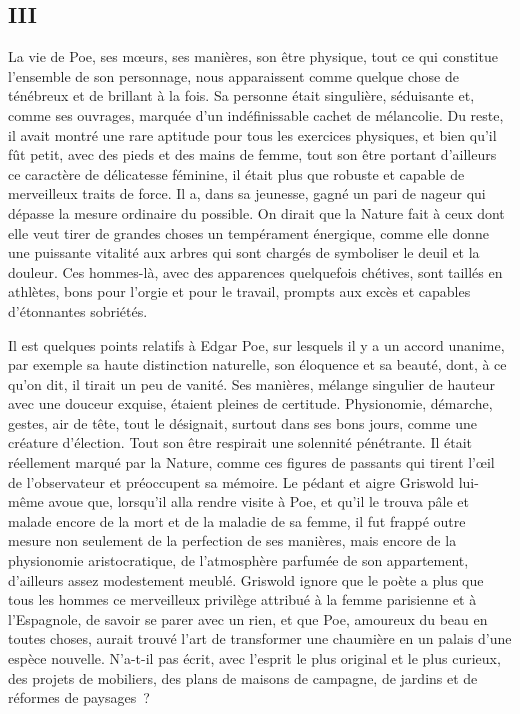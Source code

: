 \documentclass[french,twoside]{book} %
\begin{document}
\subsection[{III}]{III}
\noindent La vie de Poe, ses mœurs, ses manières, son être physique, tout ce qui constitue l’ensemble de son personnage, nous apparaissent comme quelque chose de ténébreux et de brillant à la fois. Sa personne était singulière, séduisante et, comme ses ouvrages, marquée d’un indéfinissable cachet de mélancolie. Du reste, il avait montré une rare aptitude pour tous les exercices physiques, et bien qu’il fût petit, avec des pieds et des mains de femme, tout son être portant d’ailleurs ce caractère de délicatesse féminine, il était plus que robuste et capable de merveilleux traits de force. Il a, dans sa jeunesse, gagné un pari de nageur qui dépasse la mesure ordinaire du possible. On dirait que la Nature fait à ceux dont elle veut tirer de grandes choses un tempérament énergique, comme elle donne une puissante vitalité aux arbres qui sont chargés de symboliser le deuil et la douleur. Ces hommes-là, avec des apparences quelquefois chétives, sont taillés en athlètes, bons pour l’orgie et pour le travail, prompts aux excès et capables d’étonnantes sobriétés.\par
Il est quelques points relatifs à Edgar Poe, sur lesquels il y a un accord unanime, par exemple sa haute distinction naturelle, son éloquence et sa beauté, dont, à ce qu’on dit, il tirait un peu de vanité. Ses manières, mélange singulier de hauteur avec une douceur exquise, étaient pleines de certitude. Physionomie, démarche, gestes, air de tête, tout le désignait, surtout dans ses bons jours, comme une créature d’élection. Tout son être respirait une solennité pénétrante. Il était réellement marqué par la Nature, comme ces figures de passants qui tirent l’œil de l’observateur et préoccupent sa mémoire. Le pédant et aigre Griswold lui-même avoue que, lorsqu’il alla rendre visite à Poe, et qu’il le trouva pâle et malade encore de la mort et de la maladie de sa femme, il fut frappé outre mesure non seulement de la perfection de ses manières, mais encore de la physionomie aristocratique, de l’atmosphère parfumée de son appartement, d’ailleurs assez modestement meublé. Griswold ignore que le poète a plus que tous les hommes ce merveilleux privilège attribué à la femme parisienne et à l’Espagnole, de savoir se parer avec un rien, et que Poe, amoureux du beau en toutes choses, aurait trouvé l’art de transformer une chaumière en un palais d’une espèce nouvelle. N’a-t-il pas écrit, avec l’esprit le plus original et le plus curieux, des projets de mobiliers, des plans de maisons de campagne, de jardins et de réformes de paysages ?\par
\end{document}
